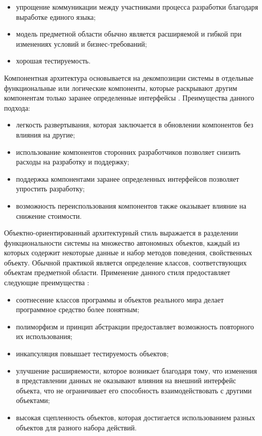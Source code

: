 \begin{itemize}
	\item упрощение коммуникации между участниками процесса разработки благодаря выработке единого языка;
	\item модель предметной области обычно является расширяемой и гибкой при изменениях условий и бизнес-требований;
	\item хорошая тестируемость.
\end{itemize}

Компонентная архитектура основывается на декомпозиции системы в отдельные функциональные или логические
компоненты, которые раскрывают другим компонентам только заранее определенные интерфейсы
\cite{application_architecture_guide}. Преимущества данного подхода:

\begin{itemize}
	\item легкость развертывания, которая заключается в обновлении компонентов без влияния на другие;
	\item использование компонентов сторонних разработчиков позволяет снизить расходы на разработку и поддержку;
	\item поддержка компонентами заранее определенных интерфейсов позволяет упростить разработку;
	\item возможность переиспользования компонентов также оказывает влияние на снижение стоимости.
\end{itemize}

Объектно-ориентированный архитектурный стиль выражается в разделении функциональности системы на множество
автономных объектов, каждый из которых содержит некоторые данные и набор методов поведения, свойственных объекту.
Обычной практикой является определение классов, соответствующих объектам предметной области. Применение данного стиля
предоставляет следующие преимущества \cite{application_architecture_guide}:

\begin{itemize}
	\item соотнесение классов программы и объектов реального мира делает программное средство более понятным;
	\item полиморфизм и принцип абстракции предоставляет возможность повторного их использования;
	\item инкапсуляция повышает тестируемость объектов;
  \item улучшение расширяемости, которое возникает благодаря тому, что изменения в представлении данных не оказывают
  влияния на внешний интерфейс объекта, что не ограничивает его способность взаимодействовать с другими объектами;
	\item высокая сцепленность объектов, которая достигается использованием разных объектов для разного набора действий.
\end{itemize}

